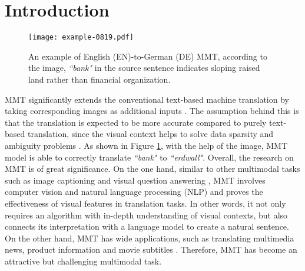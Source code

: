 \documentclass[sigconf]{acmart}
\begin{document}
\section{Introduction}
\begin{figure}[t]
\centering
\texttt{[image: example-0819.pdf]} \caption{An example of English (EN)-to-German (DE) MMT, according to the image, \emph{``bank"} in the source sentence indicates sloping raised land rather than financial organization.} 
\label{fig_example}
\end{figure}
MMT significantly extends the conventional text-based machine translation by taking corresponding images as additional inputs \cite{mmt16,mmt17,mmt18}. 
The assumption behind this is that the translation is expected to be more accurate compared to purely text-based translation, since the visual context helps to solve data sparsity and ambiguity problems \cite{acl19:twopass}. As shown in Figure \ref{fig_example}, with the help of the image, MMT model is able to correctly translate  \emph{``bank"} to \emph{``erdwall"}. 
Overall, 
the research on MMT is of great significance. On the one hand, 
similar to other multimodal tasks such as image captioning \cite{mmcaption0,mmcaption1,mmcaption2,mmcaption3} and visual question answering \cite{mmvqa0,mmvqa1,mmvqa2,mmvqa3}, 
MMT involves computer vision and natural language processing (NLP) and proves the effectiveness of visual features in translation tasks. In other words, it not only requires an algorithm with in-depth understanding of visual contexts, but also connects its interpretation with a language model to create a natural sentence. 
On the other hand, 
MMT has wide applications, such as translating multimedia news, product information and movie subtitles \cite{zhou2018visual}. Therefore, MMT has become an attractive but challenging multimodal task. 
\end{document}
